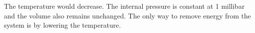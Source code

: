 The temperature would decrease. The internal pressure is constant at 1 millibar and the volume also remains unchanged. The only way to remove energy from the system is by lowering the temperature.